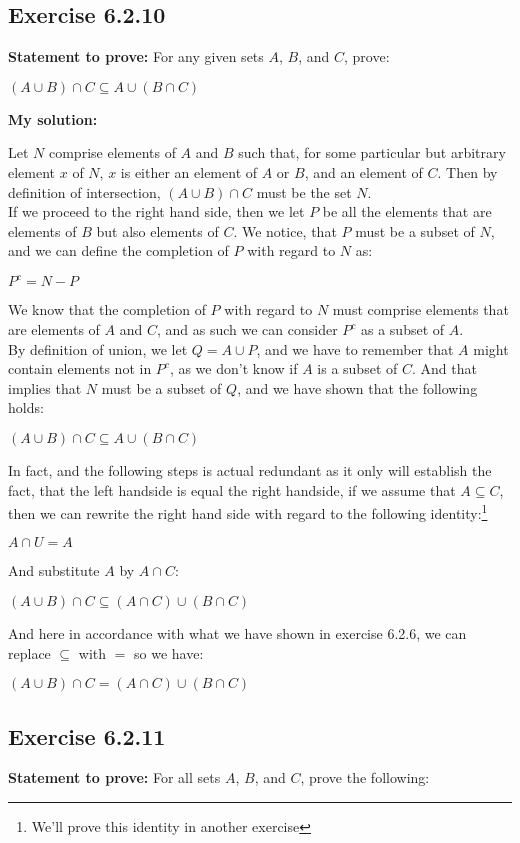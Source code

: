 \documentclass{report}
\newcommand{\cent}[1]{\begin{center}#1\end{center}}
\newcommand{\Prove}{\textbf{Statement to prove: }}
\newcommand{\solution}{\textbf{My solution: }}
\newcommand{\QED}{\boxed{}}
\newcommand{\Exercise}[1]{\subsection{Exercise #1}}
\begin{document}
	\Exercise{6.2.10}
	
	\Prove
	For any given sets $A$, $B$, and $C$, prove:
	
	\cent{$(A \cup B) \cap C \subseteq A \cup (B \cap C)$}
	
	\solution
	
	Let $N$ comprise elements of $A$ and $B$ such that, for some particular but arbitrary element $x$ of $N$, $x$ is either an element of $A$ or $B$, and an element of $C$. Then by definition of intersection, $(A \cup B) \cap C$ must be the set $N$. \\
	
	If we proceed to the right hand side, then we let $P$ be all the elements that are elements of $B$ but also elements of $C$. We notice, that $P$ must  be a subset of $N$, and we can define the completion of $P$ with regard to $N$ as:
	
	\cent{$P^c = N - P$}
	
	We know that the completion of $P$ with regard to $N$ must comprise elements that are elements of $A$ and $C$, and as such we can consider $P^c$ as a subset of $A$.\\
	
	By definition of union, we let $Q = A \cup P$, and we have to remember that $A$ might contain elements not in $P^c$, as we don't know if $A$ is a subset of $C$. And that implies that $N$ must be a subset of $Q$, and we have shown that the following holds:
	
	\cent{$(A \cup B) \cap C \subseteq A \cup (B \cap C)$}
	
	In fact, and the following steps is actual  redundant as it only will establish the fact, that the left handside is equal the right handside, if we assume that  $A \subseteq C$, then we can rewrite the right hand side with regard to the following identity:\footnote{We'll prove this identity in another exercise}
	
	\cent{$A \cap U = A$}
	
	And substitute $A$ by $A \cap C$:
	
	\cent{$(A \cup B) \cap C \subseteq (A \cap C) \cup (B \cap C)$}
	
	And here in accordance with what we have shown in exercise 6.2.6,  we can replace $\subseteq$ with $=$ so we have:
	\cent{$(A \cup B) \cap C = (A \cap C) \cup (B \cap C)$}
	\QED
	
	\Exercise{6.2.11}
	
	\Prove
	For all sets $A$, $B$, and $C$, prove the following:
	
\end{document}
